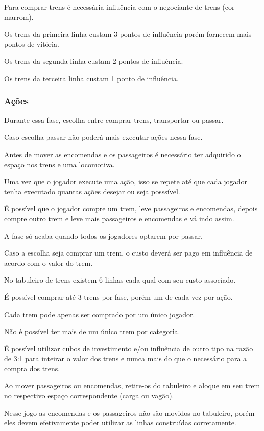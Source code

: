 \documentclass[11pt]{article}
\begin{document}
Para comprar trens é necessária influência com o negociante de trens (cor marrom).

Os trens da primeira linha custam 3 pontos de influência porém fornecem mais pontos de vitória.

Os trens da segunda linha custam 2 pontos de influência.

Os trens da terceira linha custam 1 ponto de influência.

\subsubsection{Ações}
\label{sec:org2d6fc61}

Durante essa fase, escolha entre comprar trens, transportar ou passar.

Caso escolha passar não poderá mais executar ações nessa fase.

Antes de mover as encomendas e os passageiros é necessário ter adquirido o espaço nos trens e uma locomotiva.

Uma vez que o jogador execute uma ação, isso se repete até que cada jogador tenha executado quantas ações desejar ou seja posssível.

É possível que o jogador compre um trem, leve passageiros e encomendas, depois compre outro trem e leve mais passageiros e encomendas e vá indo assim.

A fase só acaba quando todos os jogadores optarem por passar.

Caso a escolha seja comprar um trem, o custo deverá ser pago em influência de acordo com o valor do trem.

No tabuleiro de trens existem 6 linhas cada qual com seu custo associado.

É possível comprar até 3 trens por fase, porém um de cada vez por ação.

Cada trem pode apenas ser comprado por um único jogador.

Não é possível ter mais de um único trem por categoria.

É possível utilizar cubos de investimento e/ou influência de outro tipo na razão de 3:1 para inteirar o valor dos trens e nunca mais do que o necessário para a compra dos trens.

Ao mover passageiros ou encomendas, retire-os do tabuleiro e aloque em seu trem no respectivo espaço correspondente (carga ou vagão).

Nesse jogo as encomendas e os passageiros não são movidos no tabuleiro, porém eles devem efetivamente poder utilizar as linhas construídas corretamente.
\end{document}
